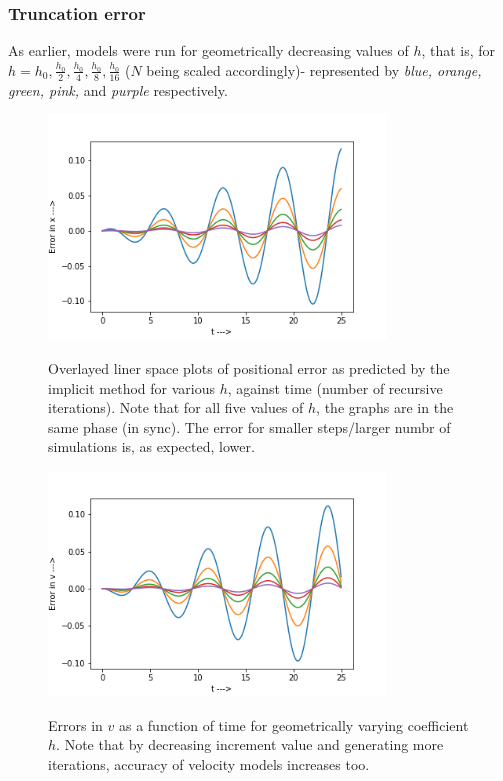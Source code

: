 \documentclass{report}
\begin{document}
\subsubsection*{Truncation error}
As earlier, models were run for geometrically decreasing values of $h$, that is, for $h=h_0, \frac{h_0}{2}, \frac{h_0}{4}, \frac{h_0}{8}, \frac{h_0}{16}$ ($N$ being scaled accordingly)- represented by \emph{blue, orange, green, pink,} and \emph{purple} respectively.
\begin{figure}[H]
	\centering
	\includegraphics[width = 0.8\textwidth]{eXci.png}
	\label{trXi}
	\caption{Overlayed liner space plots of positional error as predicted by the implicit method for various $h$, against time (number of recursive iterations). Note that for all five values of $h$, the graphs are in the same phase (in sync). The error for smaller steps/larger numbr of simulations is, as expected, lower.}
\end{figure}
\begin{figure}[H]
	\centering
	\includegraphics[width = 0.8\textwidth]{eVci.png}
	\label{trVi}
	\caption{Errors in $v$ as a function of time for geometrically varying coefficient $h$. Note that by decreasing increment value and generating more iterations, accuracy of velocity models increases too.}
\end{figure}
\end{document}
